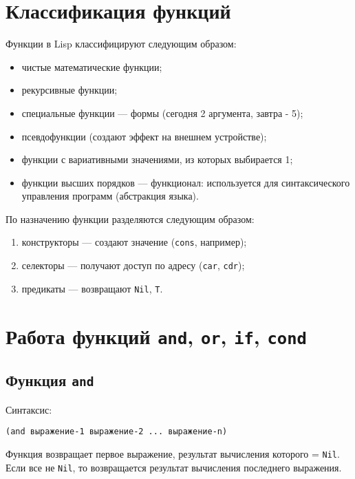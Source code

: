 \section{Классификация функций}

Функции в Lisp классифицируют следующим образом:

\begin{itemize}
    \item чистые математические функции;
    \item рекурсивные функции;
    \item специальные функции --- формы (сегодня 2 аргумента, завтра - 5);
    \item псевдофункции (создают эффект на внешнем устройстве);
    \item функции с вариативными значениями, из которых выбирается 1;
    \item функции высших порядков --- функционал: используется для синтаксического управления программ (абстракция языка).
\end{itemize}

По назначению функции разделяются следующим образом:

\begin{enumerate}
    \item конструкторы --- создают значение (\texttt{cons}, например);
    \item селекторы --- получают доступ по адресу (\texttt{car}, \texttt{cdr});
    \item предикаты --- возвращают \texttt{Nil}, \texttt{T}.
\end{enumerate}

\section{Работа функций \texttt{and}, \texttt{or}, \texttt{if}, \texttt{cond}}

\subsection{Функция \texttt{and}}

Синтаксис:
\begin{lstlisting}
(and выражение-1 выражение-2 ... выражение-n)
\end{lstlisting}

Функция возвращает первое выражение, результат вычисления которого = \texttt{Nil}. Если все не \texttt{Nil}, то возвращается результат вычисления последнего выражения.

